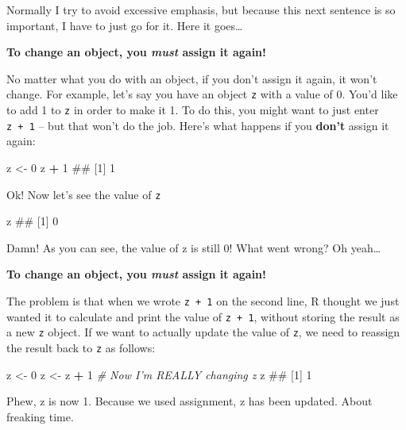 \documentclass[]{book}
\newenvironment{Shaded}{\begin{snugshade}}{\end{snugshade}}
\newcommand{\DecValTok}[1]{\textcolor[rgb]{0.00,0.00,0.81}{#1}}
\newcommand{\StringTok}[1]{\textcolor[rgb]{0.31,0.60,0.02}{#1}}
\newcommand{\CommentTok}[1]{\textcolor[rgb]{0.56,0.35,0.01}{\textit{#1}}}
\newcommand{\OperatorTok}[1]{\textcolor[rgb]{0.81,0.36,0.00}{\textbf{#1}}}
\newcommand{\NormalTok}[1]{#1}
\theoremstyle{definition}
\theoremstyle{definition}
\theoremstyle{remark}
\begin{document}
Normally I try to avoid excessive emphasis, but because this next
sentence is so important, I have to just go for it. Here it goes\ldots{}

\textbf{To change an object, you \textit{must} assign it again!}

No matter what you do with an object, if you don't assign it again, it
won't change. For example, let's say you have an object \texttt{z} with
a value of 0. You'd like to add 1 to \texttt{z} in order to make it 1.
To do this, you might want to just enter \texttt{z\ +\ 1} -- but that
won't do the job. Here's what happens if you \textbf{don't} assign it
again:

\begin{Shaded}
\begin{Highlighting}[]
\NormalTok{z <-}\StringTok{ }\DecValTok{0}
\NormalTok{z }\OperatorTok{+}\StringTok{ }\DecValTok{1}
\NormalTok{## [1] 1}
\end{Highlighting}
\end{Shaded}

Ok! Now let's see the value of \texttt{z}

\begin{Shaded}
\begin{Highlighting}[]
\NormalTok{z}
\NormalTok{## [1] 0}
\end{Highlighting}
\end{Shaded}

Damn! As you can see, the value of z is still 0! What went wrong? Oh
yeah\ldots{}

\textbf{To change an object, you \emph{must} assign it again!}

The problem is that when we wrote \texttt{z\ +\ 1} on the second line, R
thought we just wanted it to calculate and print the value of
\texttt{z\ +\ 1}, without storing the result as a new \texttt{z} object.
If we want to actually update the value of \texttt{z}, we need to
reassign the result back to \texttt{z} as follows:

\begin{Shaded}
\begin{Highlighting}[]
\NormalTok{z <-}\StringTok{ }\DecValTok{0}
\NormalTok{z <-}\StringTok{ }\NormalTok{z }\OperatorTok{+}\StringTok{ }\DecValTok{1}  \CommentTok{# Now I'm REALLY changing z}
\NormalTok{z}
\NormalTok{## [1] 1}
\end{Highlighting}
\end{Shaded}

Phew, z is now 1. Because we used assignment, z has been updated. About
freaking time.
\end{document}
